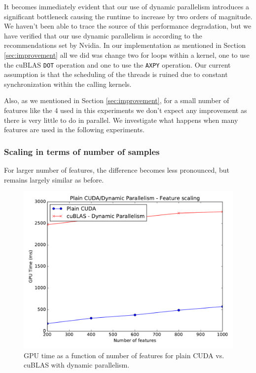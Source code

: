 \documentclass[11pt,a4paper]{article}
\begin{document}
It becomes immediately evident that our use of dynamic parallelism introduces
a significant bottleneck causing the runtime to increase by two orders of magnitude.
We haven't been able to trace the source of this performance degradation, but we have
verified that our use dynamic parallelism is according to the recommendations set
by Nvidia. In our implementation as mentioned in Section \ref{sec:improvement} all
we did was change two for loops within a kernel, one to use the cuBLAS \texttt{DOT} operation
and one to use the \texttt{AXPY} operation. Our current assumption is that the scheduling
of the threads is ruined due to constant synchronization within the calling kernels.

Also, as we mentioned in Section \ref{sec:improvement}, for a small number of features like the
4 used in this experiments we don't expect any improvement as there is very little to do in parallel.
We investigate what happens when many features are used in the following experiments.

\subsubsection*{Scaling in terms of number of samples}

For larger number of features, the difference becomes less pronounced, but remains largely similar
as before.

\begin{figure}[H]
	\centering
	\includegraphics[width=0.8\linewidth]{gpu_plain_vs_Lvl1cuBLAS-200f-1000f.pdf}
	\caption{GPU time as a function of number of features for plain CUDA vs. cuBLAS with dynamic parallelism.}
	\label{fig:plain-dpar-n-features}
\end{figure}
\end{document}

